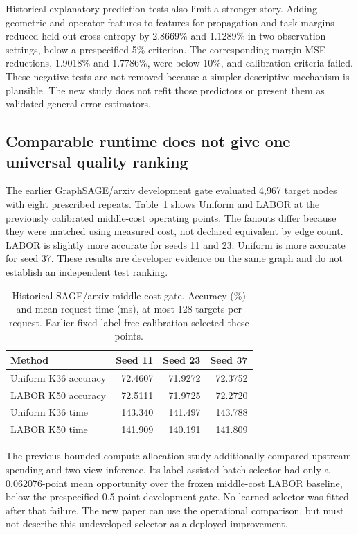 Historical explanatory prediction tests also limit a stronger story. Adding geometric and operator features to features for propagation and task margins reduced held-out cross-entropy by 2.8669\% and 1.1289\% in two observation settings, below a prespecified 5\% criterion. The corresponding margin-MSE reductions, 1.9018\% and 1.7786\%, were below 10\%, and calibration criteria failed. These negative tests are not removed because a simpler descriptive mechanism is plausible. The new study does not refit those predictors or present them as validated general error estimators.

\subsection{Comparable runtime does not give one universal quality ranking}
The earlier GraphSAGE/arxiv development gate evaluated 4,967 target nodes with eight prescribed repeats. Table~\ref{tab:sage} shows Uniform and LABOR at the previously calibrated middle-cost operating points. The fanouts differ because they were matched using measured cost, not declared equivalent by edge count. LABOR is slightly more accurate for seeds 11 and 23; Uniform is more accurate for seed 37. These results are developer evidence on the same graph and do not establish an independent test ranking.

\begin{table}[t]
\caption{Historical SAGE/arxiv middle-cost gate. Accuracy (\%) and mean request time (ms), at most 128 targets per request. Earlier fixed label-free calibration selected these points.}
\label{tab:sage}
\centering
\begin{tabular}{lrrr}
\toprule
Method & Seed 11 & Seed 23 & Seed 37\\
\midrule
Uniform K36 accuracy & 72.4607 & 71.9272 & 72.3752\\
LABOR K50 accuracy & 72.5111 & 71.9725 & 72.2720\\
Uniform K36 time & 143.340 & 141.497 & 143.788\\
LABOR K50 time & 141.909 & 140.191 & 141.809\\
\bottomrule
\end{tabular}
\end{table}

The previous bounded compute-allocation study additionally compared upstream spending and two-view inference. Its label-assisted batch selector had only a 0.062076-point mean opportunity over the frozen middle-cost LABOR baseline, below the prespecified 0.5-point development gate. No learned selector was fitted after that failure. The new paper can use the operational comparison, but must not describe this undeveloped selector as a deployed improvement.

